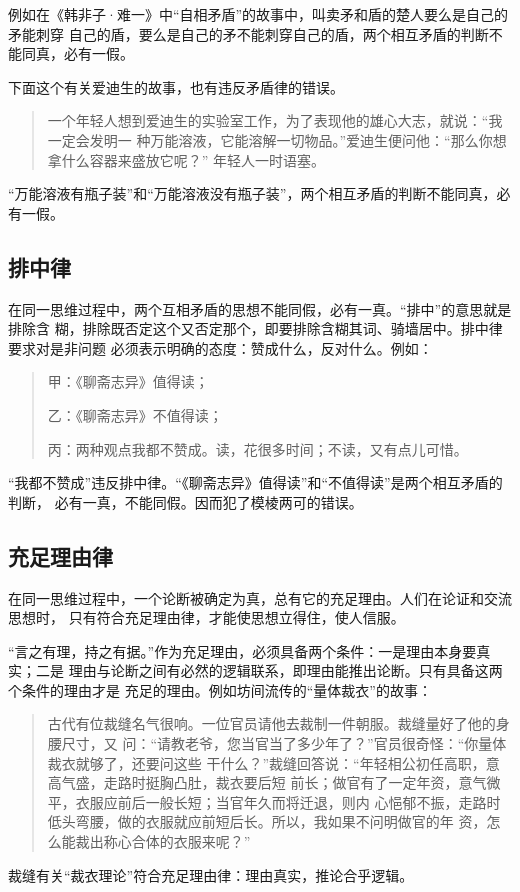 \documentclass[final,oneside]{ctexbook}
\newenvironment{equotation}{\begin{quotation}\kaishu}{\end{quotation}}
\begin{document}
例如在《韩非子·难一》中“自相矛盾”的故事中，叫卖矛和盾的楚人要么是自己的矛能刺穿
自己的盾，要么是自己的矛不能刺穿自己的盾，两个相互矛盾的判断不能同真，必有一假。

下面这个有关爱迪生的故事，也有违反矛盾律的错误。
\begin{equotation}
  一个年轻人想到爱迪生的实验室工作，为了表现他的雄心大志，就说：“我一定会发明一
  种万能溶液，它能溶解一切物品。”爱迪生便问他：“那么你想拿什么容器来盛放它呢？”
  年轻人一时语塞。
\end{equotation}
“万能溶液有瓶子装”和“万能溶液没有瓶子装”，两个相互矛盾的判断不能同真，必有一假。

\subsection{排中律}

在同一思维过程中，两个互相矛盾的思想不能同假，必有一真。“排中”的意思就是排除含
糊，排除既否定这个又否定那个，即要排除含糊其词、骑墙居中。排中律要求对是非问题
必须表示明确的态度：赞成什么，反对什么。例如：
\begin{equotation}
  甲：《聊斋志异》值得读；

  乙：《聊斋志异》不值得读；

  丙：两种观点我都不赞成。读，花很多时间；不读，又有点儿可惜。
\end{equotation}
“我都不赞成”违反排中律。“《聊斋志异》值得读”和“不值得读”是两个相互矛盾的判断，
必有一真，不能同假。因而犯了模棱两可的错误。

\subsection{充足理由律}

在同一思维过程中，一个论断被确定为真，总有它的充足理由。人们在论证和交流思想时，
只有符合充足理由律，才能使思想立得住，使人信服。

“言之有理，持之有据。”作为充足理由，必须具备两个条件：一是理由本身要真实；二是
理由与论断之间有必然的逻辑联系，即理由能推出论断。只有具备这两个条件的理由才是
充足的理由。例如坊间流传的“量体裁衣”的故事：
\begin{equotation}
  古代有位裁缝名气很响。一位官员请他去裁制一件朝服。裁缝量好了他的身腰尺寸，又
  问：“请教老爷，您当官当了多少年了？”官员很奇怪：“你量体裁衣就够了，还要问这些
  干什么？”裁缝回答说：“年轻相公初任高职，意高气盛，走路时挺胸凸肚，裁衣要后短
  前长；做官有了一定年资，意气微平，衣服应前后一般长短；当官年久而将迁退，则内
  心悒郁不振，走路时低头弯腰，做的衣服就应前短后长。所以，我如果不问明做官的年
  资，怎么能裁出称心合体的衣服来呢？”
\end{equotation}
裁缝有关“裁衣理论”符合充足理由律：理由真实，推论合乎逻辑。
\end{document}
